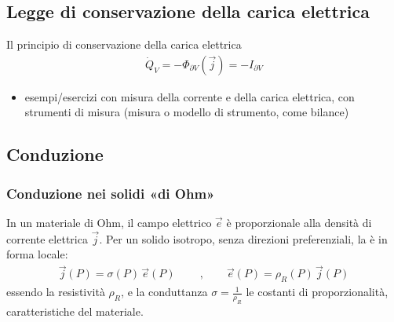 \documentclass[letterpaper,10pt,italian]{jupyterBook}
\begin{document}
\subsection{Legge di conservazione della carica elettrica}
\label{\detokenize{ch/electromagnetism/electric-current:legge-di-conservazione-della-carica-elettrica}}
\sphinxAtStartPar
Il principio di conservazione della carica elettrica
\begin{equation*}
\begin{split}\dot{Q}_V = - \Phi_{\partial V}(\vec{j}) = - I_{\partial V}\end{split}
\end{equation*}\begin{itemize}
\item {} 
\sphinxAtStartPar
{} esempi/esercizi con misura della corrente e della carica elettrica, con strumenti di misura (misura o modello di strumento, come bilance)

\end{itemize}


\subsection{Conduzione}
\label{\detokenize{ch/electromagnetism/electric-current:conduzione}}

\subsubsection{Conduzione nei solidi «di Ohm»}
\label{\detokenize{ch/electromagnetism/electric-current:conduzione-nei-solidi-di-ohm}}
\sphinxAtStartPar
In un materiale di Ohm, il campo elettrico \(\vec{e}\) è proporzionale alla densità di corrente elettrica \(\vec{j}\). Per un solido isotropo, senza direzioni preferenziali, la  è
 in forma locale:
\begin{equation*}
\begin{split}
\vec{j}(P) = \sigma(P) \, \vec{e}(P)
\qquad \ , \qquad
\vec{e}(P) = \rho_R(P) \, \vec{j}(P)
\end{split}
\end{equation*}
\sphinxAtStartPar
essendo la resistività \(\rho_R\), e la conduttanza \(\sigma = \frac{1}{\rho_R}\) le costanti di proporzionalità, caratteristiche del materiale.
\end{document}
